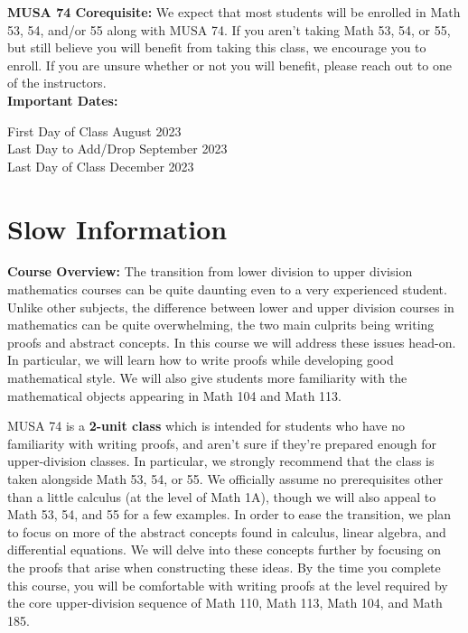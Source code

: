 \documentclass[11pt, a4paper]{article}
\begin{document}
\noindent\textbf{MUSA 74 Corequisite:} We expect that most students will be enrolled in Math 53, 54, and/or 55 along with MUSA 74. If you aren't taking Math 53, 54, or 55, but still believe you will benefit from taking this class, we encourage you to enroll. If you are unsure whether or not you will benefit, please reach out to one of the instructors. \\

\noindent\textbf{Important Dates:}
\begin{center} \begin{minipage}{3.8in}
\begin{flushleft}
First Day of Class      August 2023  \\
Last Day to Add/Drop      September 2023  \\
Last Day of Class       December 2023  \\
\end{flushleft}
\end{minipage}
\end{center}

\section*{Slow Information}
\noindent\textbf{Course Overview:} 
The transition from lower division to upper division mathematics courses can be quite daunting even to a very experienced student. Unlike other subjects, the difference between lower and upper division courses in mathematics can be quite overwhelming, the two main culprits being writing proofs and abstract concepts. In this course we will address these issues head-on. In particular, we will learn how to write proofs while developing good mathematical style. We will also give students more familiarity with the mathematical objects appearing in Math 104 and Math 113.

MUSA 74 is a \textbf{2-unit class} which is intended for students who have no familiarity with writing proofs, and aren’t sure if they’re prepared enough for upper-division classes. In particular, we strongly recommend that the class is taken alongside Math 53, 54, or 55. We officially assume no prerequisites other than a little calculus (at the level of Math 1A), though we will also appeal to Math 53, 54, and 55 for a few examples. In order to ease the transition, we plan to focus on more of the abstract concepts found in calculus, linear algebra, and differential equations. We will delve into these concepts further by focusing on the proofs that arise when constructing these ideas. By the time you complete this course, you will be comfortable with writing proofs at the level required by the core upper-division sequence of Math 110, Math 113, Math 104, and Math 185.
\end{document}
